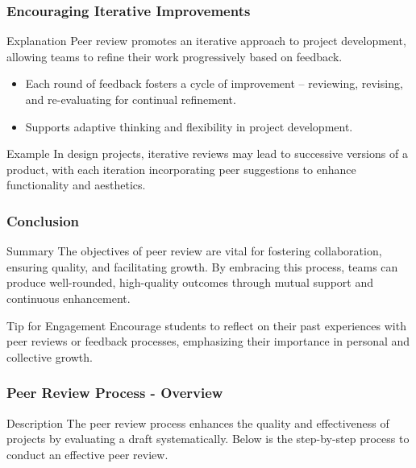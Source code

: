 \documentclass{beamer}
\begin{document}
\begin{frame}[fragile]
    \frametitle{Encouraging Iterative Improvements}
    \begin{block}{Explanation}
        Peer review promotes an iterative approach to project development, allowing teams to refine their work progressively based on feedback.
    \end{block}
    \begin{itemize}
        \item Each round of feedback fosters a cycle of improvement – reviewing, revising, and re-evaluating for continual refinement.
        \item Supports adaptive thinking and flexibility in project development.
    \end{itemize}
    \begin{block}{Example}
        In design projects, iterative reviews may lead to successive versions of a product, with each iteration incorporating peer suggestions to enhance functionality and aesthetics.
    \end{block}
\end{frame}

\begin{frame}[fragile]
    \frametitle{Conclusion}
    \begin{block}{Summary}
        The objectives of peer review are vital for fostering collaboration, ensuring quality, and facilitating growth. By embracing this process, teams can produce well-rounded, high-quality outcomes through mutual support and continuous enhancement.
    \end{block}
    \begin{block}{Tip for Engagement}
        Encourage students to reflect on their past experiences with peer reviews or feedback processes, emphasizing their importance in personal and collective growth.
    \end{block}
\end{frame}

\begin{frame}[fragile]
    \frametitle{Peer Review Process - Overview}
    \begin{block}{Description}
        The peer review process enhances the quality and effectiveness of projects by evaluating a draft systematically. Below is the step-by-step process to conduct an effective peer review.
    \end{block}
\end{frame}
\end{document}

